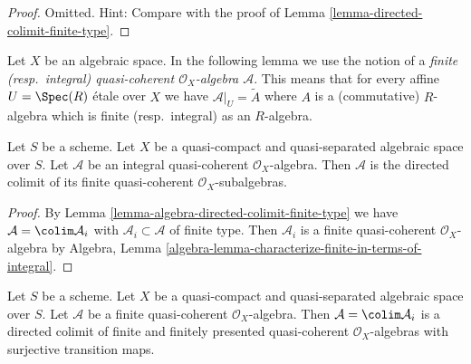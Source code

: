 \begin{proof}
Omitted. Hint: Compare with the proof of
Lemma \ref{lemma-directed-colimit-finite-type}.
\end{proof}

\noindent
Let $X$ be an algebraic space. In the following lemma we use the notion
of a {\it finite (resp.\ integral) quasi-coherent
$\mathcal{O}_X$-algebra $\mathcal{A}$}. This means that for every
affine $U = \Spec(R)$ \'etale over $X$ we have
$\mathcal{A}|_U = \widetilde{A}$ where $A$ is a (commutative) $R$-algebra
which is finite (resp.\ integral) as an $R$-algebra.

\begin{lemma}
\label{lemma-integral-algebra-directed-colimit-finite}
Let $S$ be a scheme. Let $X$ be a quasi-compact and quasi-separated
algebraic space over $S$.
Let $\mathcal{A}$ be an integral quasi-coherent $\mathcal{O}_X$-algebra.
Then $\mathcal{A}$ is the directed colimit of its finite
quasi-coherent $\mathcal{O}_X$-subalgebras.
\end{lemma}

\begin{proof}
By Lemma \ref{lemma-algebra-directed-colimit-finite-type} we have
$\mathcal{A} = \colim \mathcal{A}_i$ with $\mathcal{A}_i \subset \mathcal{A}$
of finite type. Then $\mathcal{A}_i$ is a finite quasi-coherent
$\mathcal{O}_X$-algebra by Algebra, Lemma
\ref{algebra-lemma-characterize-finite-in-terms-of-integral}.
\end{proof}

\begin{lemma}
\label{lemma-finite-algebra-directed-colimit-finite-finitely-presented}
Let $S$ be a scheme. Let $X$ be a quasi-compact and quasi-separated
algebraic space over $S$. Let $\mathcal{A}$ be a finite quasi-coherent
$\mathcal{O}_X$-algebra. Then $\mathcal{A} = \colim \mathcal{A}_i$
is a directed colimit of finite and finitely presented quasi-coherent
$\mathcal{O}_X$-algebras with surjective transition maps.
\end{lemma}

